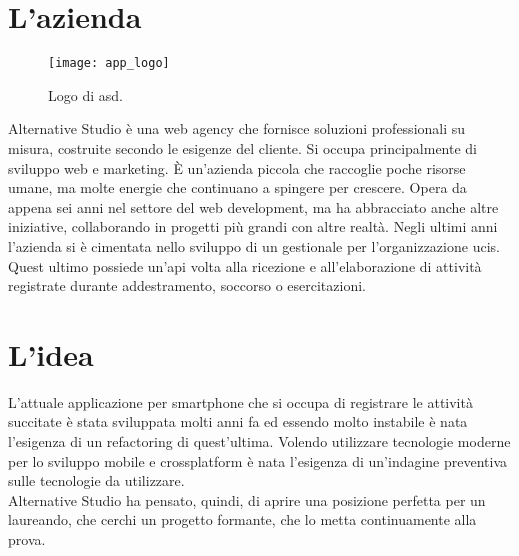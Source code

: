 
\section{L'azienda}

\begin{figure}[htbp]
	\begin{center}
		\texttt{[image: app\_logo]}
	\end{center}
	\caption {Logo di \acrlong{asd}.}
\end{figure}

Alternative Studio è una web agency che fornisce soluzioni professionali su misura, costruite secondo le esigenze del cliente. Si occupa principalmente di sviluppo web e marketing. È un'azienda piccola che raccoglie poche risorse umane, ma molte energie che continuano a spingere per crescere. Opera da appena sei anni nel settore del web development, ma ha abbracciato anche altre iniziative, collaborando in progetti più grandi con altre realtà.
Negli ultimi anni l'azienda si è cimentata nello sviluppo di un gestionale per l'organizzazione \gls{ucis}. Quest ultimo possiede un'\gls{api} volta alla ricezione e all'elaborazione di attività registrate durante addestramento, soccorso o esercitazioni.

\section{L'idea}

L'attuale applicazione per smartphone che si occupa di registrare le attività succitate è stata sviluppata molti anni fa ed essendo molto instabile è nata l'esigenza di un refactoring di quest'ultima. Volendo utilizzare tecnologie moderne per lo sviluppo mobile e crossplatform è nata l'esigenza di un'indagine preventiva sulle tecnologie da utilizzare. \\
Alternative Studio ha pensato, quindi, di aprire una posizione perfetta per un laureando, che cerchi un progetto formante, che lo metta continuamente alla prova.

